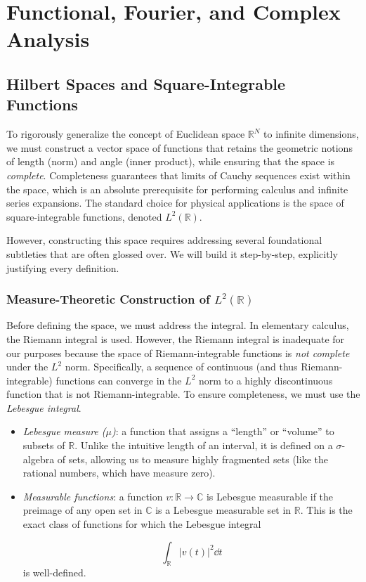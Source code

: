 \chapter{Functional, Fourier, and Complex Analysis}

\section{Hilbert Spaces and Square-Integrable Functions}

To rigorously generalize the concept of Euclidean space $\mathbb{R}^N$ to infinite dimensions, we must construct a vector space of functions that retains the geometric notions of length (norm) and angle (inner product), while ensuring that the space is \textit{complete}. Completeness guarantees that limits of Cauchy sequences exist within the space, which is an absolute prerequisite for performing calculus and infinite series expansions. The standard choice for physical applications is the space of square-integrable functions, denoted $L^2(\mathbb{R})$.

However, constructing this space requires addressing several foundational subtleties that are often glossed over. We will build it step-by-step, explicitly justifying every definition.

\subsection{Measure-Theoretic Construction of \texorpdfstring{$L^2(\mathbb{R})$}{L2(R)}}

Before defining the space, we must address the integral. In elementary calculus, the Riemann integral is used. However, the Riemann integral is inadequate for our purposes because the space of Riemann-integrable functions is \textit{not complete} under the $L^2$ norm. Specifically, a sequence of continuous (and thus Riemann-integrable) functions can converge in the $L^2$ norm to a highly discontinuous function that is not Riemann-integrable. To ensure completeness, we must use the \textit{Lebesgue integral}.
\begin{itemize}
\item \textit{Lebesgue measure ($\mu$)}: a function that assigns a ``length'' or ``volume'' to subsets of $\mathbb{R}$. Unlike the intuitive length of an interval, it is defined on a $\sigma$-algebra of sets, allowing us to measure highly fragmented sets (like the rational numbers, which have measure zero).
\item \textit{Measurable functions}: a function $v: \mathbb{R} \to \mathbb{C}$ is Lebesgue measurable if the preimage of any open set in $\mathbb{C}$ is a Lebesgue measurable set in $\mathbb{R}$. This is the exact class of functions for which the Lebesgue integral

\[
\int_\mathbb{R} |v(t)|^2 \dd t
\]
is well-defined.
\end{itemize}


